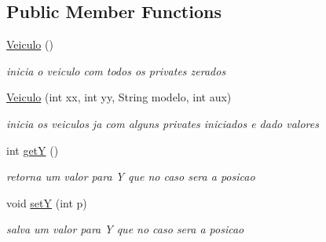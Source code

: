 \subsection*{Public Member Functions}
\begin{DoxyCompactItemize}
\item 
\mbox{\label{classcom_1_1company_1_1_veiculo_af90053fd848a2af693c83745ddf8e1b2}} 
\mbox{\hyperlink{classcom_1_1company_1_1_veiculo_af90053fd848a2af693c83745ddf8e1b2}{Veiculo}} ()
\begin{DoxyCompactList}\small\item\em inicia o veiculo com todos os privates zerados \end{DoxyCompactList}\item 
\mbox{\label{classcom_1_1company_1_1_veiculo_a41c4df426c7a44865a91805033a90c40}} 
\mbox{\hyperlink{classcom_1_1company_1_1_veiculo_a41c4df426c7a44865a91805033a90c40}{Veiculo}} (int xx, int yy, String modelo, int aux)
\begin{DoxyCompactList}\small\item\em inicia os veiculos ja com alguns privates iniciados e dado valores \end{DoxyCompactList}\item 
\mbox{\label{classcom_1_1company_1_1_veiculo_aaa9b728af0c768d45303cf571fb87aad}} 
int \mbox{\hyperlink{classcom_1_1company_1_1_veiculo_aaa9b728af0c768d45303cf571fb87aad}{getY}} ()
\begin{DoxyCompactList}\small\item\em retorna um valor para Y que no caso sera a posicao \end{DoxyCompactList}\item 
\mbox{\label{classcom_1_1company_1_1_veiculo_a9ada153473ad718329e574b9d8b08303}} 
void \mbox{\hyperlink{classcom_1_1company_1_1_veiculo_a9ada153473ad718329e574b9d8b08303}{setY}} (int p)
\begin{DoxyCompactList}\small\item\em salva um valor para Y que no caso sera a posicao \end{DoxyCompactList}\item 
\mbox{\label{classcom_1_1company_1_1_veiculo_a1dc4509f0773ea671941bddf79ae7711}} 

\end{DoxyCompactItemize}
